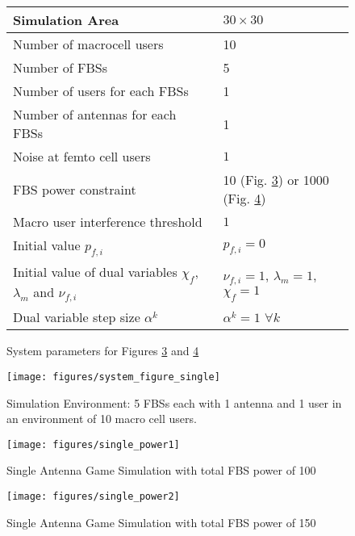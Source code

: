 \begin{center}
\begin{figure}
\begin{tabular}{ | m{8cm} | m{5cm} | } 
\hline
Simulation Area & $30 \times 30$\\ 
\hline
Number of macrocell users & 10\\ 
\hline
Number of FBSs & 5\\ 
\hline
Number of users for each FBSs & 1\\ 
\hline
Number of antennas for each FBSs & 1\\ 
\hline
Noise at femto cell users & $1$\\ 
\hline
FBS power constraint & 10 (Fig. \ref{single_power1}) or 1000 (Fig. \ref{single_power2})  \\ 
\hline
Macro user interference threshold & $1$\\ 
\hline
Initial value $p_{f,i}$ & $p_{f,i} = 0$\\
\hline
Initial value of dual variables $\chi_{f}$, $\lambda_{m}$ and $\nu_{f,i}$ & $\nu_{f,i}=1$, $\lambda_{m}=1 $, $\chi_{f}=1$\\
\hline
Dual variable step size $\alpha^k$& $\alpha^k= 1$ $\forall k$\\
\hline
\end{tabular}
\caption{System parameters for Figures \ref{single_power1} and \ref{single_power2}}
\label{table1}
\end{figure}
\end{center}

\begin{figure}[H]
	\texttt{[image: figures/system\_figure\_single]}
	  \caption{Simulation Environment: 5 FBSs each with 1 antenna and 1 user in an environment of 10 macro cell users.}
	  \label{system_figure_single}
\end{figure}

\begin{figure}[H]
	\texttt{[image: figures/single\_power1]}
	  \caption{Single Antenna Game Simulation with total FBS power of 100}
	  \label{single_power1}
\end{figure}
\begin{figure}[H]
	\texttt{[image: figures/single\_power2]}
	  \caption{Single Antenna Game Simulation with total FBS power of 150}
	  \label{single_power2}
\end{figure}


